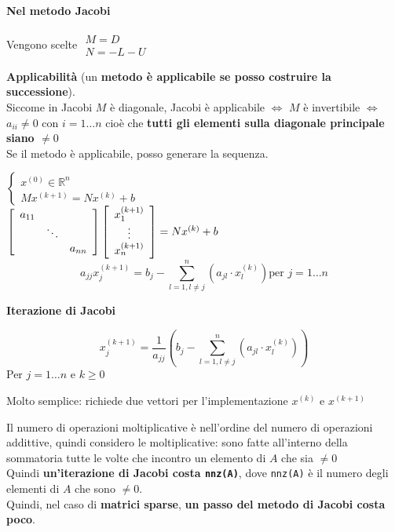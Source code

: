 \documentclass[10pt]{book}
\begin{document}
\paragraph{Nel metodo Jacobi} Vengono scelte $\begin{array}{l}
M = D\\N = -L-U
\end{array}$
\begin{list}{}{}
	\item \textbf{Applicabilità} (un \textbf{metodo è applicabile se posso costruire la successione}).\\
	Siccome in Jacobi $M$ è diagonale, Jacobi è applicabile $\Leftrightarrow$ $M$ è invertibile $\Leftrightarrow$ $a_{ii} \neq 0$ con $i = 1\ldots n$ cioè che \textbf{tutti gli elementi sulla diagonale principale siano $\neq 0$}\\
	Se il metodo è applicabile, posso generare la sequenza.
	\begin{multicols}{2}	
	$\left\{\begin{array}{l}
	x^{(0)} \in \mathbb{R}^n\\
	Mx^{(k+1)} = Nx^{(k)} + b
	\end{array}\right.$\\
	$\left[ \begin{array}{c c c}
	a_{11}\\
	& \ddots\\
	& & a_{nn}
	\end{array}\right] \left[ \begin{array}{c}
	x_1^{(k+1)}\\\vdots\\x_n^{(k+1)}
	\end{array} \right] = Nx^{(k)} + b$
	$$a_{jj} x_j^{(k+1)} = b_j - \sum_{l = 1, l\neq j}^n \left(a_{jl}\cdot x^{(k)}_l\right)\text{per }j = 1\ldots n$$
	\columnbreak
	\begin{center}
		\textbf{Iterazione di Jacobi}	
	\end{center}
	$$x_j^{(k+1)} = \frac{1}{a_{jj}} \left(b_j - \sum_{l = 1, l\neq j}^n \left(a_{jl}\cdot x^{(k)}_l\right)\right)$$
	Per $j = 1\ldots n$ e $k \geq 0$
	\end{multicols}
	\item Molto semplice: richiede due vettori per l'implementazione $x^{(k)}$ e $x^{(k+1)}$
	\item Il numero di operazioni moltiplicative è nell'ordine del numero di operazioni addittive, quindi considero le moltiplicative: sono fatte all'interno della sommatoria tutte le volte che incontro un elemento di $A$ che sia $\neq 0$\\
	Quindi \textbf{un'iterazione di Jacobi costa \texttt{nnz(A)}}, dove \texttt{nnz(A)} è il numero degli elementi di $A$ che sono $\neq 0$.\\
	Quindi, nel caso di \textbf{matrici sparse}, \textbf{un passo del metodo di Jacobi costa poco}.
\end{list}
\end{document}
